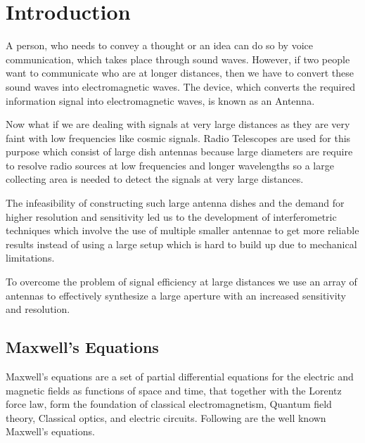 \chapter{Introduction}

A person, who needs to convey a thought or an idea can do so by voice communication, which takes place through sound waves. However, if two people want to communicate who are at longer distances, then we have to convert these sound waves into electromagnetic waves. The device, which converts the required information signal into electromagnetic waves, is known as an Antenna.

Now what if we are dealing with signals at very large distances as they are very faint with low frequencies like cosmic signals. Radio Telescopes are used for this purpose which consist of large dish antennas because large diameters are require to resolve radio sources at low frequencies and longer wavelengths so a large collecting area is needed to detect the signals at very large distances.

The infeasibility of constructing such large antenna dishes and the demand for higher resolution and sensitivity led us to the development of interferometric techniques which involve the use of multiple smaller antennae to get more reliable results instead of using a large setup which is hard to build up due to mechanical limitations.

To overcome the problem of signal efficiency at large distances we use an array of antennas to effectively synthesize a large aperture with an increased sensitivity and resolution.
 

\section{Maxwell's Equations}

Maxwell’s equations are a set of partial differential equations for the electric and magnetic fields as functions of space and time, that together with the Lorentz force law, form the foundation of classical electromagnetism, Quantum field theory, Classical optics, and electric circuits. Following are the well known Maxwell's equations.

